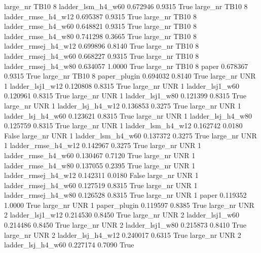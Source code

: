   large_nr     TB10                 8   ladder_lsm_h4_w60   0.672946      0.9315    True
  large_nr     TB10                 8  ladder_rmse_h4_w12   0.695387      0.9315    True
  large_nr     TB10                 8  ladder_rmse_h4_w60   0.648821      0.9315    True
  large_nr     TB10                 8  ladder_rmse_h4_w80   0.741298      0.3665    True
  large_nr     TB10                 8 ladder_rmsej_h4_w12   0.699896      0.8140    True
  large_nr     TB10                 8 ladder_rmsej_h4_w60   0.668227      0.9315    True
  large_nr     TB10                 8 ladder_rmsej_h4_w80   0.634057      1.0000    True
  large_nr     TB10                 8               paper   0.678367      0.9315    True
  large_nr     TB10                 8        paper_plugin   0.694032      0.8140    True
  large_nr      UNR                 1     ladder_lsj1_w12   0.120808      0.8315    True
  large_nr      UNR                 1     ladder_lsj1_w60   0.120961      0.8315    True
  large_nr      UNR                 1     ladder_lsj1_w80   0.121399      0.8315    True
  large_nr      UNR                 1   ladder_lsj_h4_w12   0.136853      0.3275    True
  large_nr      UNR                 1   ladder_lsj_h4_w60   0.123621      0.8315    True
  large_nr      UNR                 1   ladder_lsj_h4_w80   0.125759      0.8315    True
  large_nr      UNR                 1   ladder_lsm_h4_w12   0.162742      0.0180   False
  large_nr      UNR                 1   ladder_lsm_h4_w60   0.137372      0.3275    True
  large_nr      UNR                 1  ladder_rmse_h4_w12   0.142967      0.3275    True
  large_nr      UNR                 1  ladder_rmse_h4_w60   0.130467      0.7120    True
  large_nr      UNR                 1  ladder_rmse_h4_w80   0.137055      0.2395    True
  large_nr      UNR                 1 ladder_rmsej_h4_w12   0.142311      0.0180   False
  large_nr      UNR                 1 ladder_rmsej_h4_w60   0.127519      0.8315    True
  large_nr      UNR                 1 ladder_rmsej_h4_w80   0.126528      0.8315    True
  large_nr      UNR                 1               paper   0.119352      1.0000    True
  large_nr      UNR                 1        paper_plugin   0.119597      0.8385    True
  large_nr      UNR                 2     ladder_lsj1_w12   0.214530      0.8450    True
  large_nr      UNR                 2     ladder_lsj1_w60   0.214486      0.8450    True
  large_nr      UNR                 2     ladder_lsj1_w80   0.215873      0.8410    True
  large_nr      UNR                 2   ladder_lsj_h4_w12   0.240017      0.6315    True
  large_nr      UNR                 2   ladder_lsj_h4_w60   0.227174      0.7090    True
